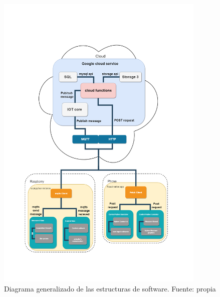 \vspace{0.5cm}\\
\begin{figure}[htbp]
	\centering
	\includegraphics[width=10cm]{figuras/GeneralDiagram.png}
	\caption{Diagrama generalizado de las estructuras de software. Fuente: propia}	
	\label{diagramaGeneralizado}
\end{figure}

